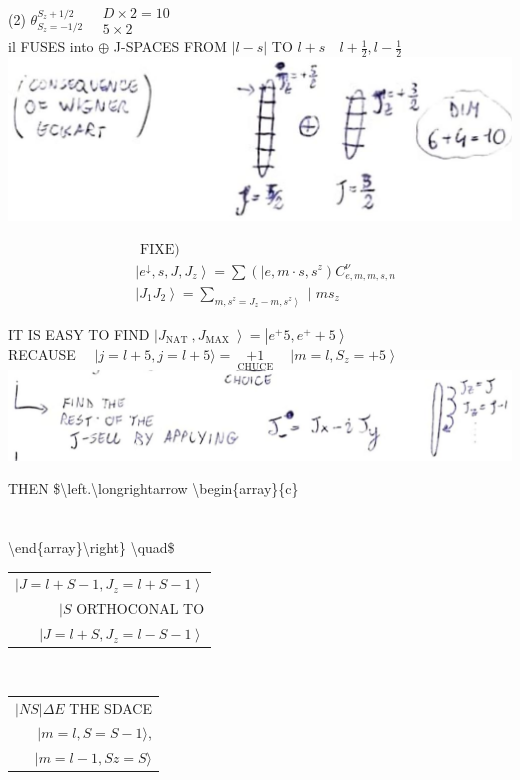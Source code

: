 \documentclass[10pt]{article}
\begin{document}
(2) $\theta_{S_{z}=-1 / 2}^{S_{z}+1 / 2} \quad \begin{gathered}D \times 2=10 \\ 5 \times 2\end{gathered}$\\
il FUSES into $\oplus$ J-SPACES FROM $|l-s|$ TO $l+s \quad l+\frac{1}{2}, l-\frac{1}{2}$\\
\includegraphics[max width=\textwidth, center]{2025_10_16_e34e240cf6beac2f9e0dg-4(1)}

$$
\begin{aligned}
& \text { FIXE) } \\
& \left|e^{\downarrow}, s, J, J_{z}\right\rangle=\sum\left(\mid e, m \cdot s, s^{z}\right) C_{e, m, m, s, n}^{\nu} \\
& \left|J_{1} J_{2}\right\rangle=\sum_{\left.m, s^{z}=J_{z}-m, s^{z}\right\rangle} \mid m s_{z}
\end{aligned}
$$

IT IS EASY TO FIND $\left|J_{\text {NAT }}, J_{\text {MAX }}\right\rangle=\left|e^{+} 5, e^{+}+5\right\rangle$\\
RECAUSE $\quad|j=l+5, j=l+5\rangle=\underset{\text { CHUCE }}{\text { +1 }} \quad\left|m=l, S_{z}=+5\right\rangle$\\
\includegraphics[max width=\textwidth, center]{2025_10_16_e34e240cf6beac2f9e0dg-4(2)}

THEN \$\textbackslash left.\textbackslash longrightarrow \textbackslash begin\{array\}\{c\} \\
\\
 \\


\textbackslash end\{array\}\textbackslash right\} \textbackslash quad\$\begin{tabular}{r}
$\left|J=l+S-1, J_{z}=l+S-1\right\rangle$ \\
$\mid S$ ORTHOCONAL TO \\
$\left|J=l+S, J_{z}=l-S-1\right\rangle$ \\
\end{tabular}$\quad$\begin{tabular}{r}
$|N S| \Delta E$ THE SDACE \\
$|m=l, S=S-1\rangle$, \\
$|m=l-1, S z=S\rangle$ \\
\end{tabular}
\end{document}
